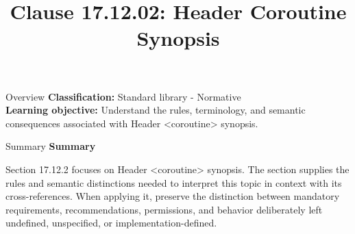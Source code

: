\documentclass[10pt,letterpaper]{article}
\title{Clause 17.12.02: Header Coroutine Synopsis}
\author{}
\date{}
\begin{document}
\maketitle
\begin{CornellOverviewBox}{Overview}
\textbf{Classification:} Standard library - Normative\\[2pt]
\textbf{Learning objective:} Understand the rules, terminology, and semantic consequences associated with Header <coroutine> synopsis.
\end{CornellOverviewBox}\begin{CornellSummaryBox}{Summary}
{\sffamily\bfseries\color{Accent} Summary}\par\vspace{3pt}Section 17.12.2 focuses on Header <coroutine> synopsis. The section supplies the rules and semantic distinctions needed to interpret this topic in context with its cross-references. When applying it, preserve the distinction between mandatory requirements, recommendations, permissions, and behavior deliberately left undefined, unspecified, or implementation-defined.
\end{CornellSummaryBox}
\end{document}
